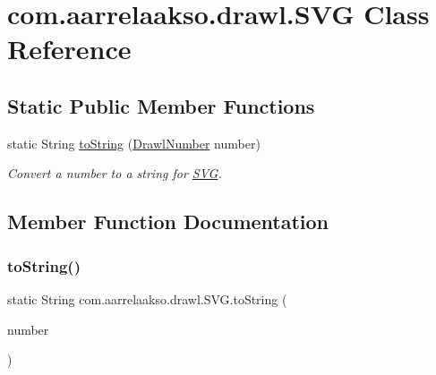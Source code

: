 \hypertarget{classcom_1_1aarrelaakso_1_1drawl_1_1_s_v_g}{}\section{com.\+aarrelaakso.\+drawl.\+S\+VG Class Reference}
\label{classcom_1_1aarrelaakso_1_1drawl_1_1_s_v_g}
\subsection*{Static Public Member Functions}
\begin{DoxyCompactItemize}
\item 
static String \hyperlink{classcom_1_1aarrelaakso_1_1drawl_1_1_s_v_g_ae360f344b090fed4452294dbf980185d}{to\+String} (\hyperlink{classcom_1_1aarrelaakso_1_1drawl_1_1_drawl_number}{Drawl\+Number} number)
\begin{DoxyCompactList}\small\item\em Convert a number to a string for \hyperlink{classcom_1_1aarrelaakso_1_1drawl_1_1_s_v_g}{S\+VG}. \end{DoxyCompactList}\end{DoxyCompactItemize}


\subsection{Member Function Documentation}
\mbox{\label{classcom_1_1aarrelaakso_1_1drawl_1_1_s_v_g_ae360f344b090fed4452294dbf980185d}} 
\subsubsection{\texorpdfstring{to\+String()}{toString()}}
{\footnotesize\ttfamily static String com.\+aarrelaakso.\+drawl.\+S\+V\+G.\+to\+String (\begin{DoxyParamCaption}\item[{\hyperlink{classcom_1_1aarrelaakso_1_1drawl_1_1_drawl_number}{Drawl\+Number}}]{number }\end{DoxyParamCaption})\hspace{0.3cm}{\ttfamily [static]}}




